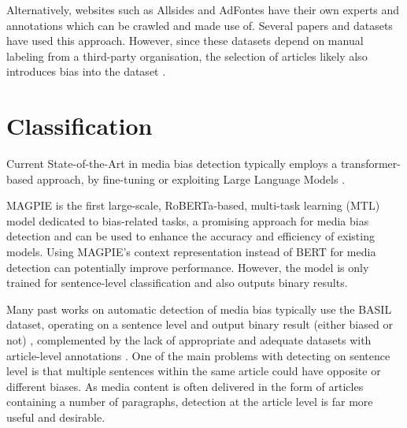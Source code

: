 Alternatively, websites such as Allsides and AdFontes have their own experts and annotations which can be crawled and made use of. Several papers and datasets \cite{spinde-2023-bat,chen-2020-nlpcss,kulkarni-2018-multi-view} have used this approach.  However, since these datasets depend on manual labeling from a third-party organisation, the selection of articles likely also introduces bias into the dataset \cite{spinde-2023-bat}.

\begin{comment}
News Unfold: (NewsUnravel shows that a user-centric approach to media bias data collection can re- turn reliable data while being scalable and evaluated as easy to use. NewsUnravel demonstrates that feedback mechanisms are a promising strategy to reduce data collection expenses and continuously update datasets to changes in context.) (Our approach augments dataset quality by significantly increasing inter-annotator agreement by 26.31\% and improving classifier performance by 2.49\%)
\end{comment}

\section{Classification}

Current State-of-the-Art in media bias detection typically employs a transformer-based approach, by fine-tuning or exploiting Large Language Models \cite{devlin-2019-bert, liu-2019-roberta}.

MAGPIE \cite{horych-2024-magpie} is the first large-scale, RoBERTa-based, multi-task learning (MTL) model dedicated to bias-related tasks, a promising approach for media bias detection and can be used to enhance the accuracy and efficiency of existing models. Using MAGPIE's context representation instead of BERT for media detection can potentially improve performance. However, the model is only trained for sentence-level classification and also outputs binary results.

Many past works on automatic detection of media bias typically use the BASIL dataset, operating on a sentence level and output binary result (either biased or not) \cite{maab-2023-lexical-bias-detection, maab-2023-target-aware, guo-2022-modeling, van-den-berg-2020-context,lee-2021-unifying,lei-2022-sentence,lei-2024-event-relation}, complemented by the lack of appropriate and adequate datasets with article-level annotations \cite{demidov-2023-political-bias-classification}. One of the main problems with detecting on sentence level is that multiple sentences within the same article could have opposite or different biases. As media content is often delivered in the form of articles containing a number of paragraphs, detection at the article level is far more useful and desirable.

